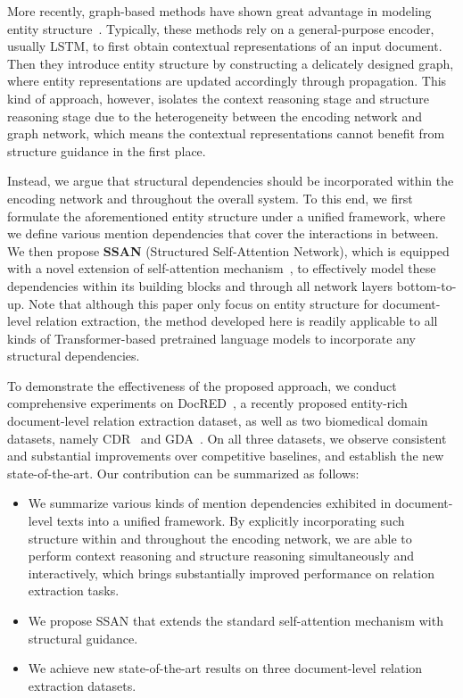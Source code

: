 \documentclass[letterpaper]{article} \usepackage{aaai21}  \usepackage{times}  \usepackage{helvet} \usepackage{courier}  \usepackage[hyphens]{url}  \usepackage{graphicx} \usepackage{booktabs}
\begin{document}
More recently, graph-based methods have shown great advantage in modeling entity structure~\cite{sahu-etal-2019-inter,christopoulou-etal-2019-connecting,nan-etal-2020-reasoning}. Typically, these methods rely on a general-purpose encoder, usually LSTM, to first obtain contextual representations of an input document. Then they introduce entity structure by constructing a delicately designed graph, where entity representations are updated accordingly through propagation.
This kind of approach, however, isolates the context reasoning stage and structure reasoning stage due to the heterogeneity between the encoding network and graph network, which means the contextual representations cannot benefit from structure guidance in the first place.

Instead, we argue that structural dependencies should be incorporated within the encoding network and throughout the overall system.
To this end, we first formulate the aforementioned entity structure under a unified framework, where we define various mention dependencies that cover the interactions in between.
We then propose \textbf{SSAN} (Structured Self-Attention Network), which is equipped with a novel extension of self-attention mechanism~\cite{vaswani2017attention}, to effectively model these dependencies within its building blocks and through all network layers bottom-to-up.
Note that although this paper only focus on entity structure for document-level relation extraction, the method developed here is readily applicable to all kinds of Transformer-based pretrained language models to incorporate any structural dependencies.




To demonstrate the effectiveness of the proposed approach, we conduct comprehensive experiments on DocRED~\cite{yao-etal-2019-docred}, a recently proposed entity-rich document-level relation extraction dataset, as well as two biomedical domain datasets, namely CDR~\cite{li2016biocreative} and GDA~\cite{wu2019renet}.
On all three datasets, we observe consistent and substantial improvements over competitive baselines, and establish the new state-of-the-art.
Our contribution can be summarized as follows:
\begin{itemize}
\item We summarize various kinds of mention dependencies exhibited in document-level texts into a unified framework.
By explicitly incorporating such structure within and throughout the encoding network, we are able to perform context reasoning and structure reasoning simultaneously and interactively, which brings substantially improved performance on relation extraction tasks.
\item We propose SSAN that extends the standard self-attention mechanism with structural guidance.
\item We achieve new state-of-the-art results on three document-level relation extraction datasets.
\end{itemize}
\end{document}
